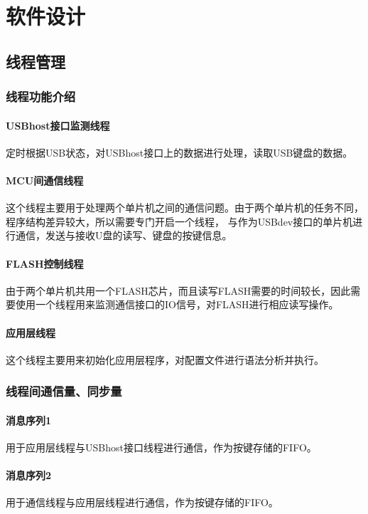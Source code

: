 
\chapter{软件设计}

\section{线程管理}

\subsection{线程功能介绍}

\subsubsection{USBhost接口监测线程}
定时根据USB状态，对USBhost接口上的数据进行处理，读取USB键盘的数据。

\subsubsection{MCU间通信线程}
这个线程主要用于处理两个单片机之间的通信问题。由于两个单片机的任务不同，程序结构差异较大，所以需要专门开启一个线程，
与作为USBdev接口的单片机进行通信，发送与接收U盘的读写、键盘的按键信息。

\subsubsection{FLASH控制线程}
由于两个单片机共用一个FLASH芯片，而且读写FLASH需要的时间较长，因此需要使用一个线程用来监测通信接口的IO信号，对FLASH进行相应读写操作。

\subsubsection{应用层线程}
这个线程主要用来初始化应用层程序，对配置文件进行语法分析并执行。

\subsection{线程间通信量、同步量}
\subsubsection{消息序列1}
用于应用层线程与USBhost接口线程进行通信，作为按键存储的FIFO。
\subsubsection{消息序列2}
用于通信线程与应用层线程进行通信，作为按键存储的FIFO。
